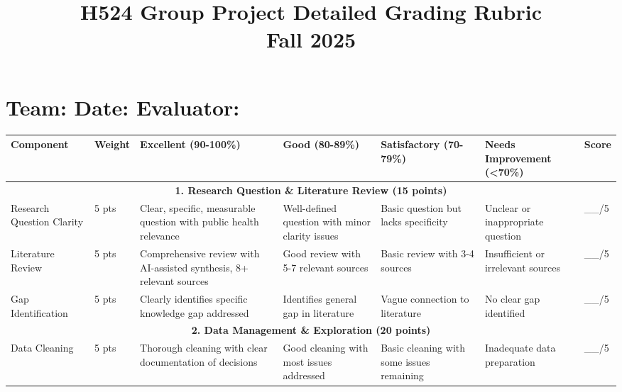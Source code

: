 \documentclass[11pt,landscape]{article}
\title{\textbf{H524 Group Project Detailed Grading Rubric\\Fall 2025}}
\date{}
\begin{document}
\maketitle

\section*{Team: \underline{\hspace{4cm}} \quad Date: \underline{\hspace{3cm}} \quad Evaluator: \underline{\hspace{4cm}}}

\begin{longtable}{|p{3.5cm}|p{1.5cm}|p{4cm}|p{4cm}|p{4cm}|p{4cm}|p{1.5cm}|}
\hline
\textbf{Component} & \textbf{Weight} & \textbf{\textcolor{excellent}{Excellent (90-100\%)}} & \textbf{\textcolor{good}{Good (80-89\%)}} & \textbf{\textcolor{satisfactory}{Satisfactory (70-79\%)}} & \textbf{\textcolor{needs}{Needs Improvement (<70\%)}} & \textbf{Score} \\
\hline
\endhead

\multicolumn{7}{|c|}{\textbf{1. Research Question \& Literature Review (15 points)}} \\
\hline

Research Question Clarity & 5 pts &
Clear, specific, measurable question with public health relevance &
Well-defined question with minor clarity issues &
Basic question but lacks specificity &
Unclear or inappropriate question &
\_\_/5 \\
\hline

Literature Review & 5 pts &
Comprehensive review with AI-assisted synthesis, 8+ relevant sources &
Good review with 5-7 relevant sources &
Basic review with 3-4 sources &
Insufficient or irrelevant sources &
\_\_/5 \\
\hline

Gap Identification & 5 pts &
Clearly identifies specific knowledge gap addressed &
Identifies general gap in literature &
Vague connection to literature &
No clear gap identified &
\_\_/5 \\
\hline

\multicolumn{7}{|c|}{\textbf{2. Data Management \& Exploration (20 points)}} \\
\hline

Data Cleaning & 5 pts &
Thorough cleaning with clear documentation of decisions &
Good cleaning with most issues addressed &
Basic cleaning with some issues remaining &
Inadequate data preparation &
\_\_/5 \\
\hline


\end{longtable}
\end{document}
